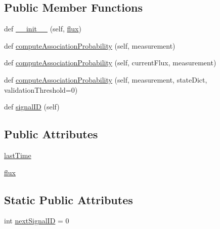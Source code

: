 \subsection*{Public Member Functions}
\begin{DoxyCompactItemize}
\item 
def \hyperlink{classmodest_1_1signals_1_1poissonsource_1_1StaticPoissonSource_aededf35e38bd6e6f148b22911e42e66c}{\+\_\+\+\_\+init\+\_\+\+\_\+} (self, \hyperlink{classmodest_1_1signals_1_1poissonsource_1_1PoissonSource_a6f2c657ad936b921715d826ac74f7fe5}{flux})
\item 
def \hyperlink{classmodest_1_1signals_1_1poissonsource_1_1StaticPoissonSource_a1754d94bff46d97817438bab552afef9}{compute\+Association\+Probability} (self, measurement)
\item 
def \hyperlink{classmodest_1_1signals_1_1poissonsource_1_1PoissonSource_a2f8a73e6f51cbdcd0f1e646d6f4d4574}{compute\+Association\+Probability} (self, current\+Flux, measurement)
\item 
def \hyperlink{classmodest_1_1signals_1_1signalsource_1_1SignalSource_a3d32dbed840ea9ac775b226f0a654831}{compute\+Association\+Probability} (self, measurement, state\+Dict, validation\+Threshold=0)
\item 
def \hyperlink{classmodest_1_1signals_1_1signalsource_1_1SignalSource_a9a64c6a9c2954f6ad61e4ca3518ea8ab}{signal\+ID} (self)
\end{DoxyCompactItemize}
\subsection*{Public Attributes}
\begin{DoxyCompactItemize}
\item 
\hyperlink{classmodest_1_1signals_1_1poissonsource_1_1PoissonSource_a34395fc83bd8743a0a5ee69f9392a606}{last\+Time}
\item 
\hyperlink{classmodest_1_1signals_1_1poissonsource_1_1PoissonSource_a6f2c657ad936b921715d826ac74f7fe5}{flux}
\end{DoxyCompactItemize}
\subsection*{Static Public Attributes}
\begin{DoxyCompactItemize}
\item 
int \hyperlink{classmodest_1_1signals_1_1signalsource_1_1SignalSource_a453eafb550b551adbec0903deb63dfce}{next\+Signal\+ID} = 0
\end{DoxyCompactItemize}


